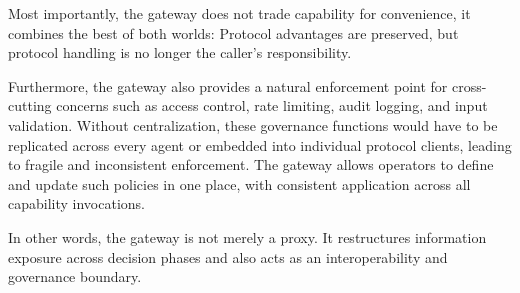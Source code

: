 Most importantly, the gateway does not trade capability for convenience, it combines the best of both worlds: 
Protocol advantages are preserved, but protocol handling is no longer the caller's responsibility.

Furthermore, the gateway also provides a natural enforcement point for cross-cutting concerns such as access control, rate limiting, audit logging, and input validation. 
Without centralization, these governance functions would have to be replicated across every agent or embedded into individual protocol clients, leading to fragile and inconsistent enforcement. 
The gateway allows operators to define and update such policies in one place, with consistent application across all capability invocations.

In other words, the gateway is not merely a proxy.
It restructures information exposure across decision phases and also acts as an interoperability and governance boundary.
